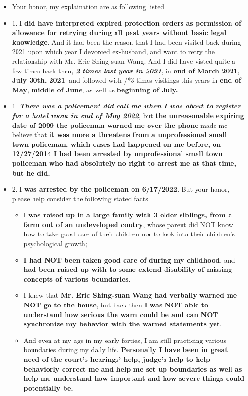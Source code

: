 \documentclass[9pt, b5paper]{article}
\begin{document}
\begin{itemize}
\item Your honor, my explaination are as following listed:
\item 1. I \textbf{did have interpreted expired protection orders as permission of allowance for retrying during all past years without basic legal knowledge}. And it had been the reason that I had been visited back during 2021 upon which year I devorced ex-husband, and want to retry the relationship with Mr. Eric Shing-suan Wang. And I did have visted quite a few times back then, \emph{\textbf{2 times last year in 2021}}, in \textbf{end of March 2021}, \textbf{July 30th, 2021}, and followed with /*3 times visitings this years in \textbf{end of May}, \textbf{middle of June}, as well as \textbf{beginning of July.}
\item 1. \emph{\textbf{There was a policement did call me when I was about to register for a hotel room in end of May 2022}}, but \textbf{the unreasonable expiring date of 2099 the policeman warned me over the phone} made me believe that \textbf{it was more a threatens from a unprofessional small town policeman, which cases had happened on me before, on 12/27/2014 I had been arrested by unprofessional small town policeman who had absolutely no right to arrest me at that time, but he did.}
\item 2. I \textbf{was arrested by the policeman on 6/17/2022}. But your honor, please help consider the following stated facts:
\begin{itemize}
\item I \textbf{was raised up in a large family with 3 elder siblings, from a farm out of an undeveloped coutry}, whose parent did NOT know how to take good care of their children nor to look into their children's psychological growth;
\item \textbf{I had NOT been taken good care of during my childhood}, and \textbf{had been raised up with to some extend disability of missing concepts of various boundaries}.
\item I knew that \textbf{Mr. Eric Shing-suan Wang had verbally warned me NOT go to the house}, but back then \textbf{I was NOT able to understand how serious the warn could be and can NOT synchronize my behavior with the warned statements yet}.
\item And even at my age in my early forties, I am still practicing various boundaries during my daily life. \textbf{Personally I have been in great need of the court's hearings' help, judge's help to help behaviorly correct me and help me set up boundaries as well as help me understand how important and how severe things could potentially be.}

\end{itemize}
\end{itemize}
\end{document}
